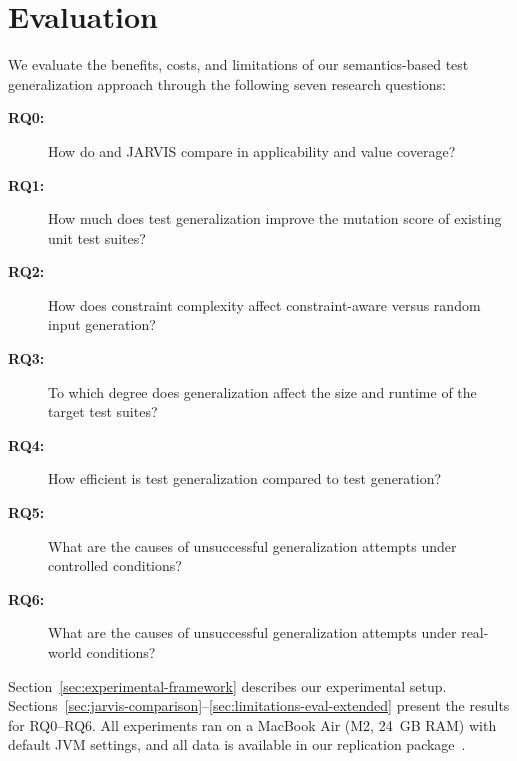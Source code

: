 \section{Evaluation}
\label{sec:evaluation}

We evaluate the benefits, costs, and limitations
of our semantics-based test generalization approach
through the following seven research questions:

\begin{description}
  \item[\textbf{RQ0:}] How do \ToolTeralizer{} and JARVIS compare in applicability and value coverage?
  \item[\textbf{RQ1:}] How much does test generalization improve the mutation score of existing unit test suites?
  \item[\textbf{RQ2:}] How does constraint complexity affect constraint-aware versus random input generation?
  \item[\textbf{RQ3:}] To which degree does generalization affect the size and runtime of the target test suites?
  \item[\textbf{RQ4:}] How efficient is test generalization compared to test generation?
  \item[\textbf{RQ5:}] What are the causes of unsuccessful generalization attempts under controlled conditions?
  \item[\textbf{RQ6:}] What are the causes of unsuccessful generalization attempts under real-world conditions?
\end{description}

Section~\ref{sec:experimental-framework} describes our experimental setup.
Sections~\ref{sec:jarvis-comparison}--\ref{sec:limitations-eval-extended} present the results for RQ0--RQ6.
All experiments ran on a MacBook Air (M2, 24~GB RAM) with default JVM settings,
and all data is available in our replication package~\cite{replicationpackage}.
